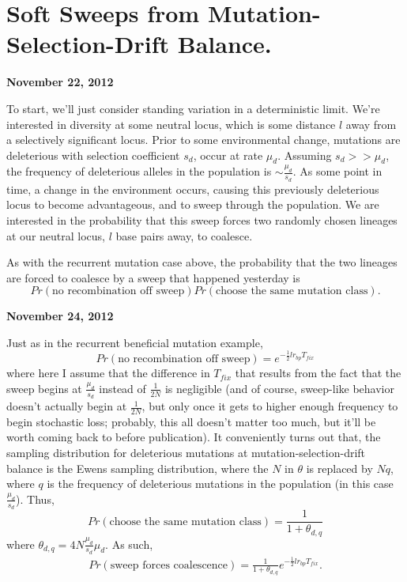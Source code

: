 \documentclass[reqno]{amsart}
\begin{document}
\newpage
\section*{Soft Sweeps from Mutation-Selection-Drift Balance.} 

\begin{flushright}
	\textbf{November 22, 2012}
\end{flushright}
To start, we'll just consider standing variation in a deterministic limit. We're interested in diversity at some neutral locus, which is some distance $l$ away from a selectively significant locus. Prior to some environmental change, mutations are deleterious with selection coefficient $s_d$, occur at rate $\mu_d$. Assuming $s_d>>\mu_d$, the frequency of deleterious alleles in the population is $\sim \frac{\mu_d}{s_d}$. As some point in time, a change in the environment occurs, causing this previously deleterious locus to become advantageous, and to sweep through the population. We are interested in the probability that this sweep forces two randomly chosen lineages at our neutral locus, $l$ base pairs away, to coalesce.

As with the recurrent mutation case above, the probability that the two lineages are forced to coalesce by a sweep that happened yesterday is
	$$Pr(\text{no recombination off sweep})Pr(\text{choose the same mutation class}).$$

\begin{flushright}
	\textbf{November 24, 2012}
\end{flushright}

Just as in the recurrent beneficial mutation example, 
\begin{equation}
	Pr(\text{no recombination off sweep}) = e^{-\frac{1}{2}lr_{bp}T_{fix}}
\end{equation}
where here I assume that the difference in $T_{fix}$ that results from the fact that the sweep begins at $\frac{\mu_d}{s_d}$ instead of $\frac{1}{2N}$ is negligible (and of course, sweep-like behavior doesn't actually begin at $\frac{1}{2N}$, but only once it gets to higher enough frequency to begin stochastic loss; probably, this all doesn't matter too much, but it'll be worth coming back to before publication). It conveniently turns out that, the sampling distribution for deleterious mutations at mutation-selection-drift balance is the Ewens sampling distribution,\cite{Ewens1972} where the $N$ in $\theta$ is replaced by $Nq$, where $q$ is the frequency of deleterious mutations in the population\cite{Hartl1982,Slatkin1997,Wakeley2008} (in this case $\frac{\mu_d}{s_d}$). Thus, 
\begin{equation}
	Pr(\text{choose the same mutation class}) = \frac{1}{1+\theta_{d,q}}
\end{equation}
where $\theta_{d,q} = 4N\frac{\mu_d}{s_d}\mu_d.$ As such,
\begin{align}
	Pr(\text{sweep forces coalescence}) = \frac{1}{1+\theta_{d,q}}e^{-\frac{1}{2}lr_{bp}T_{fix}}.
\end{align} 
\end{document}
